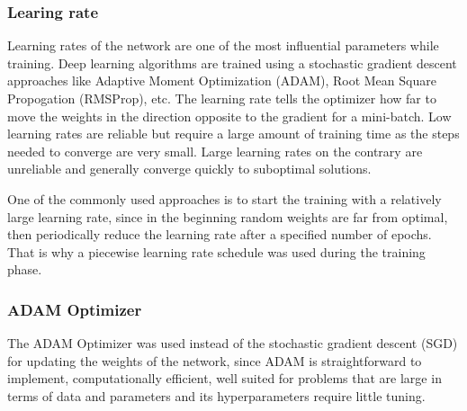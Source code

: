 \documentclass[doc/report.tex]{subfiles}
\begin{document}
\subsubsection{Learing rate}
Learning rates of the network are one of the most influential parameters while training. Deep learning algorithms are trained using a stochastic gradient descent approaches like Adaptive Moment Optimization (ADAM), Root Mean Square Propogation (RMSProp), etc. The learning rate tells the optimizer how far to move the weights in the direction opposite to the gradient for a mini-batch. Low learning rates are reliable but require a large amount of training time as the steps needed to converge are very small. Large learning rates on the contrary are unreliable and generally converge quickly to suboptimal solutions.

One of the commonly used approaches is to start the training with a relatively large learning rate, since in the beginning random weights are far from optimal, then periodically reduce the learning rate after a specified number of epochs. That is why a piecewise learning rate schedule was used during the training phase.

\subsubsection{ADAM Optimizer}
The ADAM Optimizer was used instead of the stochastic gradient descent (SGD) for updating the weights of the network, since ADAM is straightforward to implement, computationally efficient, well suited for problems that are large in terms of data and parameters and its hyperparameters require little tuning.
    
\end{document}
